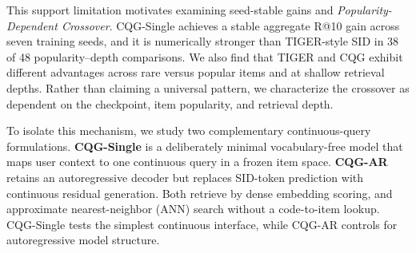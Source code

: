 \documentclass[letterpaper]{article}
\begin{document}
This support limitation motivates examining seed-stable gains and \emph{Popularity-Dependent
Crossover}. CQG-Single achieves a stable
aggregate R@10 gain across seven training seeds, and it is
numerically stronger than TIGER-style SID in 38 of 48 popularity--depth
comparisons. 
We also find that TIGER and CQG exhibit different advantages across rare versus popular items and at shallow retrieval depths. Rather than claiming a universal pattern, we characterize the crossover as dependent on the checkpoint, item popularity, and retrieval depth. 

To isolate this mechanism, we study two complementary continuous-query
formulations. \textbf{CQG-Single} is a deliberately minimal vocabulary-free
model that maps user context to one continuous query in a frozen item space.
\textbf{CQG-AR} retains an autoregressive decoder but replaces
SID-token prediction with continuous residual generation.
Both retrieve by dense embedding scoring, and approximate nearest-neighbor (ANN) search without a code-to-item lookup.
CQG-Single tests the simplest continuous interface, while CQG-AR controls for
autoregressive model structure.
\end{document}
